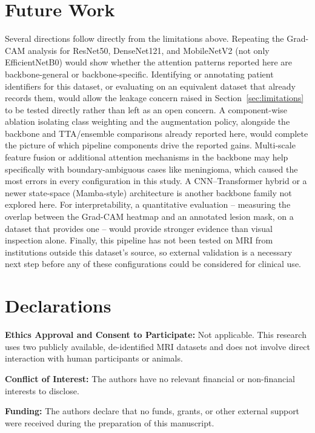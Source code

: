 \documentclass[11pt]{article}
\begin{document}
\section{Future Work}
\label{sec:futurework}
Several directions follow directly from the limitations above. Repeating the Grad-CAM analysis for ResNet50, DenseNet121, and MobileNetV2 (not only EfficientNetB0) would show whether the attention patterns reported here are backbone-general or backbone-specific. Identifying or annotating patient identifiers for this dataset, or evaluating on an equivalent dataset that already records them, would allow the leakage concern raised in Section~\ref{sec:limitations} to be tested directly rather than left as an open concern. A component-wise ablation isolating class weighting and the augmentation policy, alongside the backbone and TTA/ensemble comparisons already reported here, would complete the picture of which pipeline components drive the reported gains. Multi-scale feature fusion or additional attention mechanisms in the backbone may help specifically with boundary-ambiguous cases like meningioma, which caused the most errors in every configuration in this study. A CNN--Transformer hybrid or a newer state-space (Mamba-style) architecture is another backbone family not explored here. For interpretability, a quantitative evaluation -- measuring the overlap between the Grad-CAM heatmap and an annotated lesion mask, on a dataset that provides one -- would provide stronger evidence than visual inspection alone. Finally, this pipeline has not been tested on MRI from institutions outside this dataset's source, so external validation is a necessary next step before any of these configurations could be considered for clinical use.


\section*{Declarations}

\noindent\textbf{Ethics Approval and Consent to Participate:} Not applicable. This research uses two publicly available, de-identified MRI datasets and does not involve direct interaction with human participants or animals.

\noindent\textbf{Conflict of Interest:} The authors have no relevant financial or non-financial interests to disclose.

\noindent\textbf{Funding:} The authors declare that no funds, grants, or other external support were received during the preparation of this manuscript.
\end{document}
